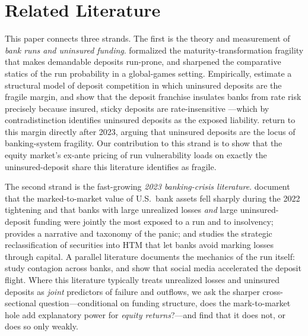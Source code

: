 \documentclass[12pt]{article}
\begin{document}
\section{Related Literature}\label{sec:lit}
This paper connects three strands. The first is the theory and measurement of \emph{bank
runs and uninsured funding}. \citet{diamond1983} formalized the maturity-transformation
fragility that makes demandable deposits run-prone, and \citet{goldstein2005} sharpened the
comparative statics of the run probability in a global-games setting. Empirically,
\citet{egan2017} estimate a structural model of deposit competition in which uninsured
deposits are the fragile margin, and \citet{drechsler2021} show that the deposit franchise
insulates banks from rate risk precisely because insured, sticky deposits are rate-insensitive
---which by contradistinction identifies uninsured deposits as the exposed liability.
\citet{drechsler2023} return to this margin directly after 2023, arguing that uninsured
deposits are the locus of banking-system fragility. Our contribution to this strand is to
show that the equity market's ex-ante pricing of run vulnerability loads on exactly the
uninsured-deposit share this literature identifies as fragile.

The second strand is the fast-growing \emph{2023 banking-crisis literature}. \citet{jiang2024}
document that the marked-to-market value of U.S.\ bank assets fell sharply during the 2022
tightening and that banks with large unrealized losses \emph{and} large uninsured-deposit
funding were jointly the most exposed to a run and to insolvency; \citet{metrick2024}
provides a narrative and taxonomy of the panic; and \citet{granja2023} studies the strategic
reclassification of securities into HTM that let banks avoid marking losses through capital.
A parallel literature documents the mechanics of the run itself: \citet{choi2023} study
contagion across banks, and \citet{cookson2023} show that social media accelerated the
deposit flight. Where this literature typically treats unrealized losses and uninsured
deposits as \emph{joint} predictors of failure and outflows, we ask the sharper
cross-sectional question---conditional on funding structure, does the mark-to-market hole add
explanatory power for \emph{equity returns}?---and find that it does not, or does so only
weakly.
\end{document}
